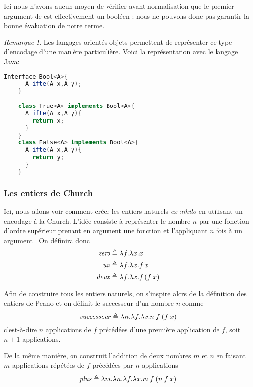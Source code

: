\documentclass {article}
\theoremstyle{definition}
\theoremstyle{remark}
\newtheorem{remark}{Remarque}
\begin{document}
Ici nous n'avons aucun moyen de vérifier avant normalisation que le
premier argument de \Ifte{} est effectivement un booléen : nous ne
pouvons donc pas garantir la bonne évaluation de notre terme.

\begin{remark}
  Les langages orientés objets permettent de représenter ce type d'encodage d'une manière particulière.
  Voici la représentation avec le langage Java:
  \begin{lstlisting}[language=java]
    Interface Bool<A>{
      A ifte(A x,A y);
    }
    
    class True<A> implements Bool<A>{
      A ifte(A x,A y){
        return x;
      }
    }
    class False<A> implements Bool<A>{
      A ifte(A x,A y){
        return y;
      }
    }    
  \end{lstlisting}
\end{remark}


\subsubsection{Les entiers de Church}

\newcommand{\Zero}{\mathit{zero}}
\newcommand{\Un}{\mathit{un}}
\newcommand{\Deux}{\mathit{deux}}
\newcommand{\Succ}{\mathit{successeur}}
\newcommand{\Plus}{\mathit{plus}}


Ici, nous allons voir comment créer les entiers naturels \textit{ex
  nihilo} en utilisant un encodage à la Church. L'idée consiste à
représenter le nombre \(n\) par une fonction d'ordre supérieur prenant
en argument une fonction  et l'appliquant \(n\) fois à un
argument . On définira donc
%
\begin{align*}
\Zero &\triangleq \Lam{f}{\Lam{x}{x}}\\ 
\Un   &\triangleq \Lam{f}{\Lam{x}{\App{f}{x}}} \\
\Deux &\triangleq \Lam{f}{\Lam{x}{\App{f}{(\App{f}{x}})}}
\end{align*}

Afin de construire tous les entiers naturels, on s'inspire alors de la
définition des entiers de Peano et on définit le successeur d'un nombre \(n\)
comme
%
\[
\Succ \triangleq \Lam{n}{\Lam{f}{\Lam{x}{\App{\App{n}{f}}{(\App{f}{x})}}}}
\]
%
c'est-à-dire \(n\) applications de \(f\) précédées d'une première
application de \(f\), soit \(n+1\) applications.

De la même manière, on construit l'addition de deux nombres \(m\) et
\(n\) en faisant \(m\) applications répétées de \(f\) précédées par
\(n\) applications :
%
\[
\Plus \triangleq \Lam{m}{\Lam{n}{\Lam{f}{\Lam{x}{\App{\App{m}{f}}{(\App{\App{n}{f}}{x}})}}}}
\]
\end{document}
